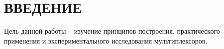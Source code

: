 \section*{ВВЕДЕНИЕ}

Цель данной работы -- изучение принципов построения, практического
применения и экспериментального исследования мультиплексоров.
